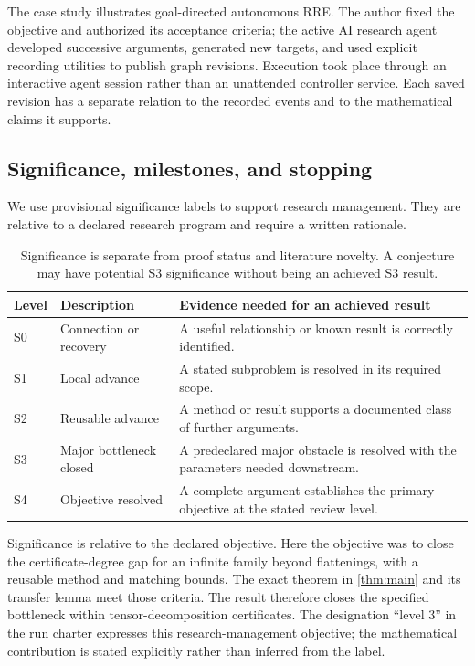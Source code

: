The case study illustrates goal-directed autonomous RRE. The author fixed the objective and authorized its acceptance criteria; the active AI research agent developed successive arguments, generated new targets, and used explicit recording utilities to publish graph revisions. Execution took place through an interactive agent session rather than an unattended controller service. Each saved revision has a separate relation to the recorded events and to the mathematical claims it supports.

\subsection{Significance, milestones, and stopping}\label{sec:significance}

We use provisional significance labels to support research management. They are relative to a declared research program and require a written rationale.

\begin{table}[htbp]
\centering\small
\begin{tabularx}{\linewidth}{@{}p{1cm}p{3cm}Y@{}}
\toprule
Level & Description & Evidence needed for an achieved result \\
\midrule
S0 & Connection or recovery & A useful relationship or known result is correctly identified. \\
S1 & Local advance & A stated subproblem is resolved in its required scope. \\
S2 & Reusable advance & A method or result supports a documented class of further arguments. \\
S3 & Major bottleneck closed & A predeclared major obstacle is resolved with the parameters needed downstream. \\
S4 & Objective resolved & A complete argument establishes the primary objective at the stated review level. \\
\bottomrule
\end{tabularx}
\caption{Significance is separate from proof status and literature novelty. A conjecture may have potential S3 significance without being an achieved S3 result.}
\end{table}

Significance is relative to the declared objective. Here the objective was to close the certificate-degree gap for an infinite family beyond flattenings, with a reusable method and matching bounds. The exact theorem in \cref{thm:main} and its transfer lemma meet those criteria. The result therefore closes the specified bottleneck within tensor-decomposition certificates. The designation ``level 3'' in the run charter expresses this research-management objective; the mathematical contribution is stated explicitly rather than inferred from the label.

